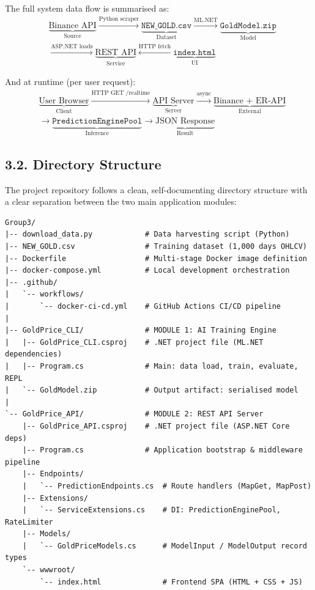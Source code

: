 The full system data flow is summarised as:
\[
\begin{aligned}
&\underbrace{\text{Binance API}}_{\text{Source}} \xrightarrow{\text{Python scraper}} \underbrace{\texttt{NEW\_GOLD.csv}}_{\text{Dataset}} \xrightarrow{\text{ML.NET}} \underbrace{\texttt{GoldModel.zip}}_{\text{Model}} \\
&\xrightarrow{\text{ASP.NET loads}} \underbrace{\text{REST API}}_{\text{Service}} \xleftarrow{\text{HTTP fetch}} \underbrace{\texttt{index.html}}_{\text{UI}}
\end{aligned}
\]

And at runtime (per user request):
\[
\begin{aligned}
&\underbrace{\text{User Browser}}_{\text{Client}} \xrightarrow{\text{HTTP GET /realtime}} \underbrace{\text{API Server}}_{\text{Server}} \xrightarrow{\text{async}} \underbrace{\text{Binance + ER-API}}_{\text{External}} \\
&\rightarrow \underbrace{\texttt{PredictionEnginePool}}_{\text{Inference}} \rightarrow \underbrace{\text{JSON Response}}_{\text{Result}}
\end{aligned}
\]

\subsection{3.2. Directory Structure}

The project repository follows a clean, self-documenting directory structure with a clear separation between the two main application modules:

\begin{lstlisting}[language={}, numbers=none, frame=single, basicstyle=\ttfamily\footnotesize]
Group3/
|-- download_data.py            # Data harvesting script (Python)
|-- NEW_GOLD.csv                # Training dataset (1,000 days OHLCV)
|-- Dockerfile                  # Multi-stage Docker image definition
|-- docker-compose.yml          # Local development orchestration
|-- .github/
|   `-- workflows/
|       `-- docker-ci-cd.yml    # GitHub Actions CI/CD pipeline
|
|-- GoldPrice_CLI/              # MODULE 1: AI Training Engine
|   |-- GoldPrice_CLI.csproj    # .NET project file (ML.NET dependencies)
|   |-- Program.cs              # Main: data load, train, evaluate, REPL
|   `-- GoldModel.zip           # Output artifact: serialised model
|
`-- GoldPrice_API/              # MODULE 2: REST API Server
    |-- GoldPrice_API.csproj    # .NET project file (ASP.NET Core deps)
    |-- Program.cs              # Application bootstrap & middleware pipeline
    |-- Endpoints/
    |   `-- PredictionEndpoints.cs  # Route handlers (MapGet, MapPost)
    |-- Extensions/
    |   `-- ServiceExtensions.cs    # DI: PredictionEnginePool, RateLimiter
    |-- Models/
    |   `-- GoldPriceModels.cs      # ModelInput / ModelOutput record types
    `-- wwwroot/
        `-- index.html              # Frontend SPA (HTML + CSS + JS)
\end{lstlisting}

